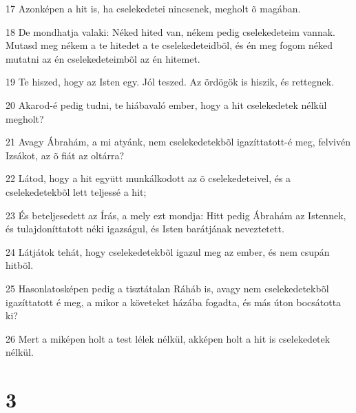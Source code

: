 \par 17 Azonképen a hit is, ha cselekedetei nincsenek, megholt õ magában.
\par 18 De mondhatja valaki: Néked hited van, nékem pedig cselekedeteim vannak. Mutasd meg nékem a te hitedet a te cselekedeteidbõl, és én meg fogom néked mutatni az én cselekedeteimbõl az én hitemet.
\par 19 Te hiszed, hogy az Isten egy. Jól teszed. Az ördögök is hiszik,  és rettegnek.
\par 20 Akarod-é pedig tudni, te hiábavaló ember, hogy a hit cselekedetek nélkül megholt?
\par 21 Avagy Ábrahám, a mi atyánk, nem cselekedetekbõl igazíttatott-é meg, felvivén Izsákot, az õ fiát az oltárra?
\par 22 Látod, hogy a hit együtt munkálkodott az õ cselekedeteivel, és a cselekedetekbõl lett teljessé a hit;
\par 23 És beteljesedett az Írás, a mely ezt mondja: Hitt pedig Ábrahám az Istennek, és tulajdoníttatott néki igazságul, és Isten  barátjának neveztetett.
\par 24 Látjátok tehát, hogy cselekedetekbõl igazul meg az ember, és nem csupán hitbõl.
\par 25 Hasonlatosképen pedig a tisztátalan Ráháb is, avagy nem cselekedetekbõl igazíttatott é meg, a mikor a követeket házába fogadta, és más úton bocsátotta ki?
\par 26 Mert a miképen holt a test lélek nélkül, akképen holt a hit is cselekedetek nélkül.

\chapter{3}

